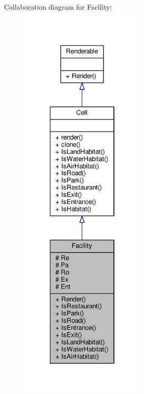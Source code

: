 Collaboration diagram for Facility\+:
\nopagebreak
\begin{figure}[H]
\begin{center}
\leavevmode
\includegraphics[height=550pt]{classFacility__coll__graph}
\end{center}
\end{figure}
